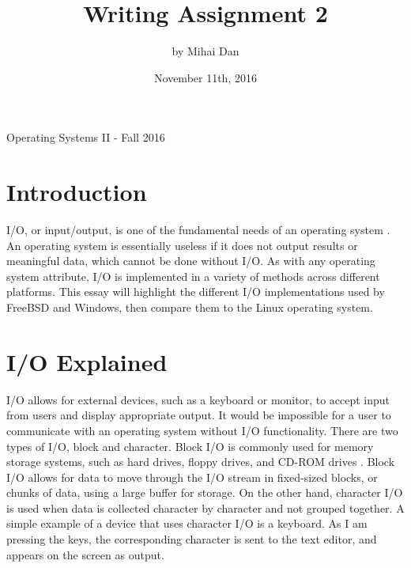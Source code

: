 \documentclass[10pt, onecolumn]{IEEEtran}
\title{Writing Assignment 2}
\author{by Mihai Dan}
\date{November 11th, 2016}
\begin{document}
    \begin{center}
        \begin{minipage}[h]{\textwidth}
            \maketitle
        \end{minipage}
    \end{center}
    
    \begin{center}
        Operating Systems II - Fall 2016
    \end{center}
    
    \newpage
    
    
    \section{Introduction}
        I/O, or input/output, is one of the fundamental needs of an operating system \cite{McGrath}. An operating system is essentially useless if it does not output results or meaningful data, which cannot be done without I/O. As with any operating system attribute, I/O is implemented in a variety of methods across different platforms. This essay will highlight the different I/O implementations used by FreeBSD and Windows, then compare them to the Linux operating system.

    
    \section{I/O Explained}
        I/O allows for external devices, such as a keyboard or monitor, to accept input from users and display appropriate output. It would be impossible for a user to communicate with an operating system without I/O functionality. There are two types of I/O, block and character. Block I/O is commonly used for memory storage systems, such as hard drives, floppy drives, and CD-ROM drives \cite{ch13}. Block I/O allows for data to move through the I/O stream in fixed-sized blocks, or chunks of data, using a large buffer for storage. On the other hand, character I/O is used when data is collected character by character and not grouped together. A simple example of a device that uses character I/O is a keyboard. As I am pressing the keys, the corresponding character is sent to the text editor, and appears on the screen as output.
        
        \vspace{1.5mm}
        
\end{document}

